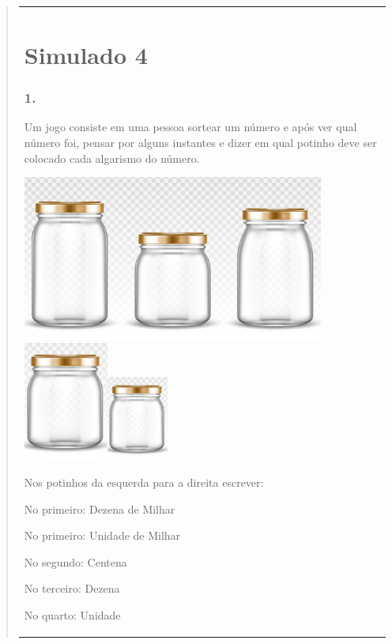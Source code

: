 \begin{enumerate}
\begin{escolha}
\begin{enumerate}
\begin{itemize}
\begin{itemize}
\begin{escolha}
\begin{quote}
\begin{escolha}
{\begin{longtable}[]{@{}l@{}}
\begin{itemize}
\section{Simulado 4}\label{simulado-4}

\subsubsection{1. }\label{section-187}

Um jogo consiste em uma pessoa sortear um número e após ver qual número
foi, pensar por alguns instantes e dizer em qual potinho deve ser
colocado cada algarismo do número.

\includegraphics[width=3.90833in,height=2.14168in]{media/image163.png}
\includegraphics[width=1.10010in,height=1.54180in]{media/image164.png}\includegraphics[width=0.78333in,height=1.09785in]{media/image164.png}

Nos potinhos da esquerda para a direita escrever:

No primeiro: Dezena de Milhar

No primeiro: Unidade de Milhar

No segundo: Centena

No terceiro: Dezena

No quarto: Unidade


\end{itemize}
\end{longtable}}
\end{escolha}
\end{quote}
\end{escolha}
\end{itemize}
\end{itemize}
\end{enumerate}
\end{escolha}
\end{enumerate}
